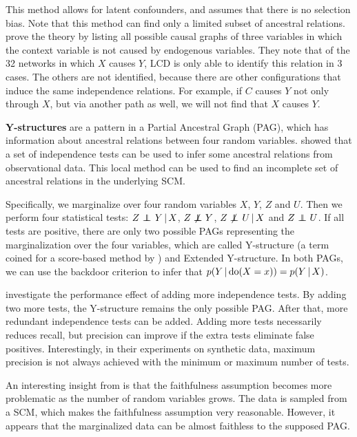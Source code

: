 This method allows for latent confounders, and assumes that there is no selection bias. Note that this method can find only a limited subset of ancestral relations. \citep{cooper1997simple} prove the theory by listing all possible causal graphs of three variables in which the context variable is not caused by endogenous variables. They note that of the 32 networks in which $X$ causes $Y$, LCD is only able to identify this relation in 3 cases. The others are not identified, because there are other configurations that induce the same independence relations. For example, if $C$ causes $Y$ not only through $X$, but via another path as well, we will not find that $X$ causes $Y$.  


\textbf{Y-structures} are a pattern in a Partial Ancestral Graph (PAG), which has information about ancestral relations between four random variables. \citet{mooij2015empirical} showed that a set of independence tests can be used to infer some ancestral relations from observational data. This local method can be used to find an incomplete set of ancestral relations in the underlying SCM. 

Specifically, we marginalize over four random variables $X$, $Y$, $Z$ and $U$. Then we perform four statistical tests: ${Z} \operatorname*{{\,\perp\mkern-12mu\perp\,}}_{} {Y} \,|\, {X}$, $Z \operatorname*{{\,\not\mkern-1mu\perp\mkern-12mu\perp\,}} Y$, ${Z} \operatorname*{{\,\not\mkern-1mu\perp\mkern-12mu\perp\,}}_{} {U} \,|\, {X}$ and $Z \operatorname*{{\,\perp\mkern-12mu\perp\,}} U$. If all tests are positive, there are only two possible PAGs representing the marginalization over the four variables, which are called Y-structure (a term coined for a score-based method by \citet{mani2006bayesian}) and Extended Y-structure. In both PAGs, we can use the backdoor criterion to infer that $p(Y\,|\, \mathrm{do}(X=x))=p(Y\,|\, X)$.

\citet{mooij2015empirical} investigate the performance effect of adding more independence tests. By adding two more tests, the Y-structure remains the only possible PAG. After that, more redundant independence tests can be added. Adding more tests necessarily reduces recall, but precision can improve if the extra tests eliminate false positives. Interestingly, in their experiments on synthetic data, maximum precision is not always achieved with the minimum or maximum number of tests.

An interesting insight from \citet{mooij2015empirical} is that the faithfulness assumption becomes more problematic as the number of random variables grows. The data is sampled from a SCM, which makes the faithfulness assumption very reasonable. However, it appears that the marginalized data can be almost faithless to the supposed PAG. 

